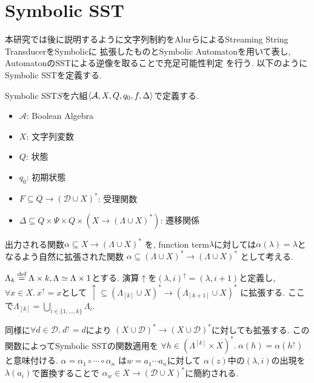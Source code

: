\documentclass[uplatex,dvipdfmx,a4j]{jsreport}
\begin{document}
  \chapter{Symbolic SST}  \label{chap:symbolic_sst}
  本研究では後に説明するように文字列制約をAlurらによるStreaming String TransducerをSymbolicに
  拡張したものとSymbolic Automatonを用いて表し, AutomatonのSSTによる逆像を取ることで充足可能性判定
  を行う. 以下のようにSymbolic SSTを定義する.

  \begin{definition}

    Symbolic SST$S$を六組${\langle {\mathcal{A}, X, Q, q_0, f, \Delta} \rangle}$で定義する.
    \begin{itemize}
      \item $\mathcal{A}$: Boolean Algebra
      \item $X$: 文字列変数
      \item $Q$: 状態
      \item $q_0$: 初期状態
      \item $F \subseteq Q \rightarrow (\mathcal{D} \cup X)^*$: 受理関数
      \item $\Delta \subseteq Q \times \Psi \times
      Q \times (X \rightarrow (\Lambda \cup X)^*)$: 遷移関係
    \end{itemize}
    出力される関数$\alpha \subseteq X \rightarrow (\Lambda \cup X)^*$
    を, function term$\lambda$に対しては$\alpha(\lambda) = \lambda$となるよう自然に拡張された関数
    $\alpha \subseteq (\Lambda \cup X)^* \rightarrow (\Lambda \cup X)^*$
    として考える.

    $\Lambda_k \overset{\scriptsize \mbox{def}}{=} \Lambda \times k, \Lambda \simeq \Lambda \times 1$とする.
    演算$\uparrow$を$(\lambda, i)^\uparrow = (\lambda, i + 1)$と定義し,
    $\forall x \in X.\ x^\uparrow = x$として
    $\uparrow \subseteq
    (\Lambda_{[k]} \cup X)^* \rightarrow (\Lambda_{[k + 1]} \cup X)^*$
    に拡張する.
    ここで$\Lambda_{[k]} = \bigcup_{i \in \{ 1, \ldots, k \}} \Lambda_i$.

    同様に$\forall d \in \mathcal{D}.\ d^\uparrow = d$により
    $(X \cup \mathcal{D})^* \rightarrow (X \cup \mathcal{D})^*$に対しても拡張する.
    この関数によってSymbolic SSTの関数適用を
    $\forall h \in (\Lambda^{[k]} \times X)^*.\ \alpha(h) = \alpha(h^\uparrow)$
    と意味付ける.
    $\alpha = \alpha_1 \circ \cdots \circ \alpha_n$
    は$w = a_1 \cdots a_n$に対して
    $\alpha(z)$中の$(\lambda, i)$の出現を$\lambda(a_i)$で置換することで
    $\alpha_w \in X \rightarrow (\mathcal{D} \cup X)^*$に簡約される.


\end{definition}
\end{document}

